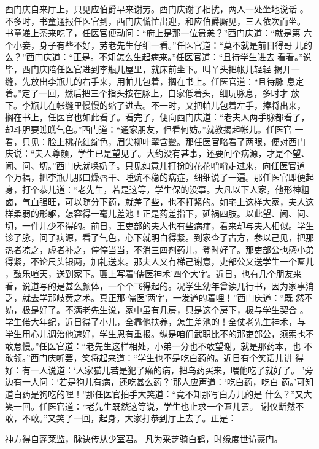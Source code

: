 西门庆自来厅上，只见应伯爵早来谢劳。西门庆谢了相扰，两人一处坐地说话
。不多时，书童通报任医官到，西门庆慌忙出迎，和应伯爵厮见，三人依次而坐。
书童递上茶来吃了，任医官便动问：“府上是那一位贵恙？”西门庆道：“就是第
六个小妾，身子有些不好，劳老先生仔细一看。”任医官道：“莫不就是前日得哥
儿的么？”西门庆道：“正是。不知怎么生起病来。”任医官道：“且待学生进去
看看。”说毕，西门庆陪任医官进到李瓶儿屋里，就床前坐下。叫丫头把帐儿轻轻
揭开一缝，先放出李瓶儿的右手来，用帕儿包着，搁在书上。任医官道：“且待脉
息定着。”定了一回，然后把三个指头按在脉上，自家低着头，细玩脉息，多时才
放下。李瓶儿在帐缝里慢慢的缩了进去。不一时，又把帕儿包着左手，捧将出来，
搁在书上，任医官也如此看了。看完了，便向西门庆道：“老夫人两手脉都看了，
却斗胆要瞧瞧气色。”西门道：“通家朋友，但看何妨。”就教揭起帐儿。任医官
一看，只见：脸上桃花红绽色，眉尖柳叶翠含颦。那任医官略看了两眼，便对西门
庆说：“夫人尊颜，学生已是望见了。大约没有甚事，还要问个病源，才是个望、
闻、问、切。”西门庆就唤奶子。只见如意儿打扮的花花哨哨走过来，向任医官道
个万福，把李瓶儿那口燥唇干、睡炕不稳的病症，细细说了一遍。那任医官即便起
身，打个恭儿道：“老先生，若是这等，学生保的没事。大凡以下人家，他形神粗
卤，气血强旺，可以随分下药，就差了些，也不打紧的。如宅上这样大家，夫人这
样柔弱的形躯，怎容得一毫儿差池！正是药差指下，延祸四肢。以此望、闻、问、
切，一件儿少不得的。前日，王吏部的夫人也有些病症，看来却与夫人相似。学生
诊了脉，问了病源，看了气色，心下就明白得紧。到家查了古方，参以己见，把那
热者凉之，虚者补之，停停当当，不消三四剂药儿，登时好了。那吏部公也感小弟
得紧，不论尺头银两，加礼送来。那夫人又有梯己谢意，吏部公又送学生一个匾儿
，鼓乐喧天，送到家下。匾上写着‘儒医神术’四个大字。近日，也有几个朋友来
看，说道写的是甚么颜体，一个个飞得起的。况学生幼年曾读几行书，因为家事消
乏，就去学那岐黄之术。真正那‘儒医’两字，一发道的着哩！”西门庆道：“既
然不妨，极是好了。不满老先生说，家中虽有几房，只是这个房下，极与学生契合
。学生偌大年纪，近日得了小儿，全靠他扶养，怎生差池的！全仗老先生神术，与
学生用心儿调治他速好，学生恩有重报。纵是咱们武职比不的那吏部公，须索也不
敢怠慢。”任医官道：“老先生这样相处，小弟一分也不敢望谢。就是那药本，也
不敢领。”西门庆听罢，笑将起来道：“学生也不是吃白药的。近日有个笑话儿讲
得好：有一人说道：‘人家猫儿若是犯了癞的病，把乌药买来，喂他吃了就好了。
’旁边有一人问：‘若是狗儿有病，还吃甚么药？’那人应声道：‘吃白药，吃白
药。’可知道白药是狗吃的哩！”那任医官拍手大笑道：“竟不知那写白方儿的是
什么？”又大笑一回。任医官道：“老先生既然这等说，学生也止求一个匾儿罢。
谢仪断然不敢，不敢。”又笑了一回，起身，大家打恭到厅上去了。正是：

神方得自蓬莱监，脉诀传从少室君。
凡为采芝骑白鹤，时缘度世访豪门。